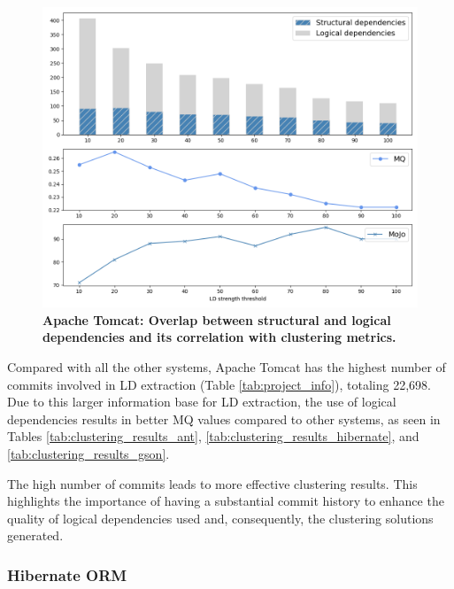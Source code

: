 \documentclass{ieeeaccess}
\begin{document}
\begin{figure}[t!]
  \centering
  \includegraphics[width=\columnwidth]{catalina_correlation.png}
  \caption{\textbf{Apache Tomcat: Overlap between structural and logical dependencies and its correlation with clustering metrics.}}
  \label{fig:catalina_correlation}
\end{figure}

Compared with all the other systems, Apache Tomcat has the highest number of commits involved in LD extraction (Table \ref{tab:project_info}), totaling 22,698. Due to this larger information base for LD extraction, the use of logical dependencies results in better MQ values compared to other systems, as seen in Tables \ref{tab:clustering_results_ant}, \ref{tab:clustering_results_hibernate}, and \ref{tab:clustering_results_gson}.

The high number of commits leads to more effective clustering results. This highlights the importance of having a substantial commit history to enhance the quality of logical dependencies used and, consequently, the clustering solutions generated.


\subsubsection{Hibernate ORM}
\end{document}
